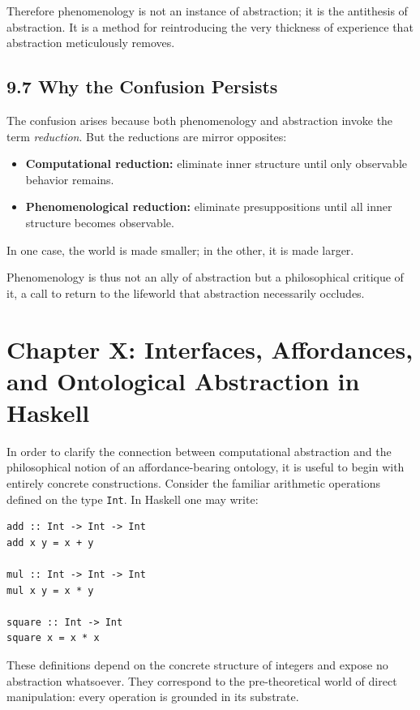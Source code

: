 \documentclass[12pt,letterpaper]{article}
\begin{document}
Therefore phenomenology is not an instance of abstraction; it is the antithesis of abstraction. It is a method for reintroducing the very thickness of experience that abstraction meticulously removes.

\subsection{9.7 Why the Confusion Persists}
The confusion arises because both phenomenology and abstraction invoke the term \emph{reduction}. But the reductions are mirror opposites:

\begin{itemize}
    \item \textbf{Computational reduction:} eliminate inner structure until only observable behavior remains.
    \item \textbf{Phenomenological reduction:} eliminate presuppositions until all inner structure becomes observable.
\end{itemize}

In one case, the world is made smaller; in the other, it is made larger.

Phenomenology is thus not an ally of abstraction but a philosophical critique of it, a call to return to the lifeworld that abstraction necessarily occludes.

\newpage

\section{Chapter X: Interfaces, Affordances, and Ontological Abstraction in Haskell}

In order to clarify the connection between computational abstraction and the philosophical notion of an affordance-bearing ontology, it is useful to begin with entirely concrete constructions. Consider the familiar arithmetic operations defined on the type \texttt{Int}. In Haskell one may write:
\begin{verbatim}
add :: Int -> Int -> Int
add x y = x + y

mul :: Int -> Int -> Int
mul x y = x * y

square :: Int -> Int
square x = x * x
\end{verbatim}

These definitions depend on the concrete structure of integers and expose no abstraction whatsoever. They correspond to the pre-theoretical world of direct manipulation: every operation is grounded in its substrate.
\end{document}

